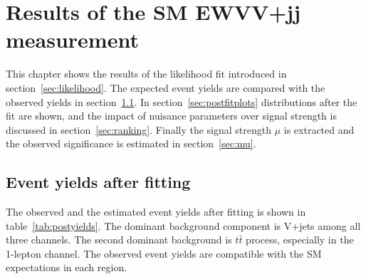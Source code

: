 \chapter{Results of the SM EWVV+jj measurement}
\label{chap:results}
This chapter shows the results of the likelihood fit introduced in section~\ref{sec:likelihood}.
The expected event yields are compared with the observed yields in section~\ref{sec:eventyields}.
In section~\ref{sec:postfitplots} distributions after the fit are shown, and the impact of nuisance parameters over signal strength is discussed in section~\ref{sec:ranking}.
Finally the signal strength $\mu$ is extracted and the observed significance is estimated in section~\ref{sec:mu}.

\section{Event yields after fitting}
\label{sec:eventyields}

The observed and the estimated event yields after fitting is shown in table~\ref{tab:postyields}.
The dominant background component is V+jets among all three channels. The second dominant background is $t\bar{t}$ process, especially in the 1-lepton channel. The observed event yields are compatible with the SM expectations in each region.

